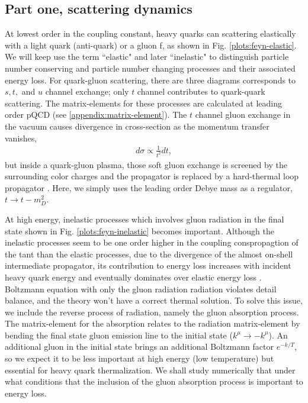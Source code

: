 \documentclass[aps, prc, reprint, amsmath, groupedaddress, nofootinbib]{revtex4-1}
\begin{document}
\subsection{Part one, scattering dynamics}
At lowest order in the coupling constant, heavy quarks can scattering elastically with a light quark (anti-quark) or a gluon f, as shown in Fig. \ref{plots:feyn-elastic}.
We will keep use the term ``elastic" and later ``inelastic" to distinguish particle number conserving and particle number changing processes and their associated energy loss.
For quark-gluon scattering, there are three diagrams corresponds to $s, t,$ and $u$ channel exchange; only $t$ channel contributes to quark-quark scattering.
The matrix-elements for these processes are calculated at leading order pQCD (see \ref{appendix:matrix-element}).
The $t$ channel gluon exchange in the vacuum causes divergence in cross-section as the momentum transfer vanishes,
\begin{eqnarray}
d\sigma \propto \frac{1}{t^2} dt,
\end{eqnarray}
but inside a quark-gluon plasma, those soft gluon exchange is screened by the surrounding color charges and the propagator is replaced by a hard-thermal loop propagator \cite{}.
Here, we simply uses the leading order Debye mass as a regulator, $t \rightarrow t - m_D^2$.

At high energy, inelastic processes which involves gluon radiation in the final state shown in Fig. \ref{plots:feyn-inelastic} becomes important.
Although the inelastic processes seem to be one order higher in the coupling conspropagtion of the tant than the elastic processes, due to the divergence of the almost on-shell intermediate propagator, its contribution to energy loss increases with incident heavy quark energy and eventually dominates over elastic energy loss \cite{}.
Boltzmann equation with only the gluon radiation radiation violates detail balance, and the theory won't have a correct thermal solution.
To solve this issue, we include the reverse process of radiation, namely the gluon absorption process.
The matrix-element for the absorption relates to the radiation matrix-element by bending the final state gluon emission line to the initial state ($k^\mu \rightarrow -k^\mu$).
An additional gluon in the initial state brings an additional Boltzmann factor $e^{-k/T}$, so we expect it to be less important at high energy (low temperature) but essential for heavy quark thermalization.
We shall study numerically that under what conditions that the inclusion of the gluon absorption process is important to energy loss.
\end{document}
